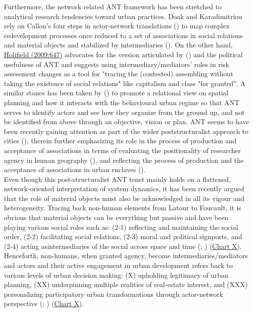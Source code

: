 \documentclass[11pt]{report}
\begin{document}
{{{{Furthermore, the network related ANT framework has been stretched to analytical research tendencies toward urban practices. Doak and Karadimitriou rely on Callon’s four steps in actor-network translations  (\href{Callon}{\citealt{callon_elements_1986}}) to map complex redevelopment processes once reduced to a set of associations in social relations and material objects and stabilized by intermediaries (\href{Doak}{\citealt{doak_re_2007}}). On the other hand, \href{Holifield}{Holifield (2009:647)}  advocates for the version articulated by (\href{Latour}{\citealt{latour_actor-network_1996}}) and the political usefulness of ANT and suggests using  intermediary/mediators' roles in risk assessment changes as a tool for "tracing the (contested) assembling without taking the existence of social relations" like capitalism and class "for granted". A similar stance has been taken by (\href{Boelens}{\citealt{boelens_theorizing_2010}}) to promote a relational view on spatial planning and how it interacts with the behavioural urban regime so that ANT serves to identify actors and see how they organize from the ground up, and not be identified from above through an objective, vision or plan. ANT seems to have been recently gaining attention as part of the wider poststructuralist approach to cities  (\href{Smith}{\citealt{smith_ordinary_2013}}), therein further emphasizing its role in the process of production and acceptance of associations in terms of evaluating the positionality of researcher agency in human geography (\href{Ruming}{\citealt{ruming_following_2009}}), and  reflecting the process of production and the acceptance of associations in urban enclaves (\href{Wissink}{\citealt{wissink_enclave_2013}}).
\\

Even though this post-structuralist ANT tenet mainly holds on a flattened, network-oriented interpretation of system dynamics, it has been recently argued that the role of material objects must also be acknowledged in all its vigour and heterogeneity. Tracing back non-human elements from Latour to Foucault, it is obvious that material objects can be everything but passive and have been playing various social roles such as: (2-1) reflecting and maintaining the social order, (2-2) facilitating social relations, (2-3) moral and political signposts, and (2-4) acting asintermediaries of the social across space and time (\href{Sayes}{\citealt{sayes_actor-network_2014}}; \href{Van Assche}{\citealt{van_assche_power_2014}}) (\href{Table 1}{Chart X}). Henceforth, non-humans, when granted agency, become intermediaries/mediators and actors and their active engagement in urban development refers back to various levels of urban decision making: (X) upholding legitimacy of urban planning, (XX) underpinning multiple realities of real-estate interest, and (XXX) personalizing participatory urban transformations through actor-network perspective (\href{Latour}{\citealt{latour_actor-network_1996}}; \href{Rydin}{\citealt{rydin_actor-network_2010}} \href{Van Assche}{\citealt{van_assche_power_2014}}) (\href{Table 1}{Chart X}).
\\

}}}}
\end{document}
